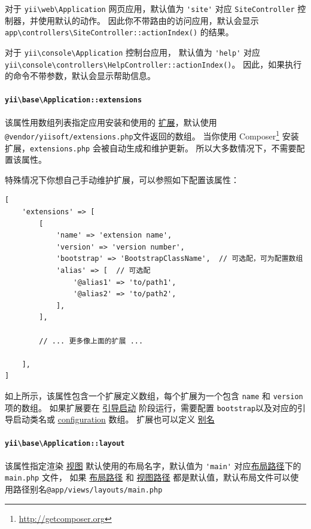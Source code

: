 对于 \texttt{yii{\allowbreak{}\textbackslash}web{\allowbreak{}\textbackslash}Application} 网页应用，默认值为 \lstinline|'site'| 对应 \lstinline|SiteController| 控制器，并使用默认的动作。
因此你不带路由的访问应用，默认会显示 \lstinline|app\controllers\SiteController::actionIndex()| 的结果。

对于 \texttt{yii{\allowbreak{}\textbackslash}console{\allowbreak{}\textbackslash}Application} 控制台应用，
默认值为 \lstinline|'help'| 对应 \texttt{yii{\allowbreak{}\textbackslash}console{\allowbreak{}\textbackslash}controllers{\allowbreak{}\textbackslash}HelpController\allowbreak{}::\allowbreak{}actionIndex()}。
因此，如果执行的命令不带参数，默认会显示帮助信息。

\paragraph{\texttt{yii{\allowbreak{}\textbackslash}base{\allowbreak{}\textbackslash}Application\allowbreak{}::\allowbreak{}extensions} \label{structure-applications.md::extensions}}
该属性用数组列表指定应用安装和使用的 \hyperref[structure-extensions.md]{扩展}，默认使用\lstinline|@vendor/yiisoft/extensions.php|文件返回的数组。
当你使用 Composer\footnote{\url{http://getcomposer.org}} 安装扩展，\lstinline|extensions.php| 会被自动生成和维护更新。
所以大多数情况下，不需要配置该属性。

特殊情况下你想自己手动维护扩展，可以参照如下配置该属性：

\lstset{language=php}\begin{lstlisting}
[
    'extensions' => [
        [
            'name' => 'extension name',
            'version' => 'version number',
            'bootstrap' => 'BootstrapClassName',  // 可选配，可为配置数组
            'alias' => [  // 可选配
                '@alias1' => 'to/path1',
                '@alias2' => 'to/path2',
            ],
        ],

        // ... 更多像上面的扩展 ...

    ],
]
\end{lstlisting}
如上所示，该属性包含一个扩展定义数组，每个扩展为一个包含 \lstinline|name| 和 \lstinline|version| 项的数组。
如果扩展要在 \hyperref[runtime-bootstrapping.md]{引导启动} 阶段运行，需要配置 \lstinline|bootstrap|以及对应的引导启动类名或 \hyperref[concept-configurations.md]{configuration} 数组。
扩展也可以定义 \hyperref[concept-aliases.md]{别名}

\paragraph{\texttt{yii{\allowbreak{}\textbackslash}base{\allowbreak{}\textbackslash}Application\allowbreak{}::\allowbreak{}layout} \label{structure-applications.md::layout}}
该属性指定渲染 \hyperref[structure-views.md]{视图} 默认使用的布局名字，默认值为 \lstinline|'main'| 对应\hyperref[structure-applications.md::::layoutPath]{布局路径}下的 \lstinline|main.php| 文件，
如果 \hyperref[structure-applications.md::::layoutPath]{布局路径} 和 \hyperref[structure-applications.md::::viewPath]{视图路径} 都是默认值，默认布局文件可以使用路径别名\lstinline|@app/views/layouts/main.php|

